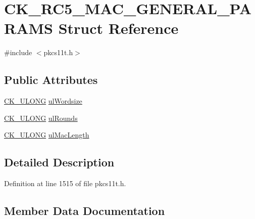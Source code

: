 \hypertarget{struct_c_k___r_c5___m_a_c___g_e_n_e_r_a_l___p_a_r_a_m_s}{}\section{C\+K\+\_\+\+R\+C5\+\_\+\+M\+A\+C\+\_\+\+G\+E\+N\+E\+R\+A\+L\+\_\+\+P\+A\+R\+A\+MS Struct Reference}
\label{struct_c_k___r_c5___m_a_c___g_e_n_e_r_a_l___p_a_r_a_m_s}


{\ttfamily \#include $<$pkcs11t.\+h$>$}

\subsection*{Public Attributes}
\begin{DoxyCompactItemize}
\item 
\hyperlink{pkcs11t_8h_a35181858a3b7a0a81f49d180d8f446ef}{C\+K\+\_\+\+U\+L\+O\+NG} \hyperlink{struct_c_k___r_c5___m_a_c___g_e_n_e_r_a_l___p_a_r_a_m_s_ab5c8eda50a02ba6eb5f418be440f2f16}{ul\+Wordsize}
\item 
\hyperlink{pkcs11t_8h_a35181858a3b7a0a81f49d180d8f446ef}{C\+K\+\_\+\+U\+L\+O\+NG} \hyperlink{struct_c_k___r_c5___m_a_c___g_e_n_e_r_a_l___p_a_r_a_m_s_a4159d1166521a81e37d733545e4fa33a}{ul\+Rounds}
\item 
\hyperlink{pkcs11t_8h_a35181858a3b7a0a81f49d180d8f446ef}{C\+K\+\_\+\+U\+L\+O\+NG} \hyperlink{struct_c_k___r_c5___m_a_c___g_e_n_e_r_a_l___p_a_r_a_m_s_a31039f2bba7398cc408c830a3b6010e8}{ul\+Mac\+Length}
\end{DoxyCompactItemize}


\subsection{Detailed Description}


Definition at line 1515 of file pkcs11t.\+h.



\subsection{Member Data Documentation}
\mbox{\label{struct_c_k___r_c5___m_a_c___g_e_n_e_r_a_l___p_a_r_a_m_s_a31039f2bba7398cc408c830a3b6010e8}} 
